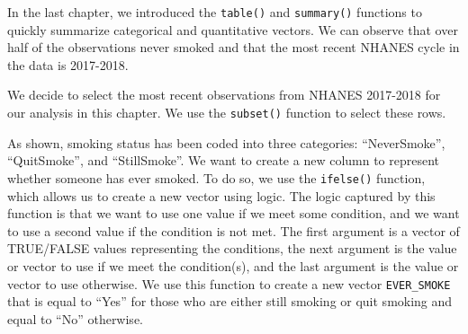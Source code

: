 \documentclass[
  letterpaper,
]{latex/krantz}
\makeatletter
\newenvironment{Shaded}{\begin{snugshade}}{\end{snugshade}}
\newcommand{\CommentTok}[1]{\textcolor[rgb]{0.37,0.37,0.37}{#1}}
\newcommand{\DecValTok}[1]{\textcolor[rgb]{0.68,0.00,0.00}{#1}}
\newcommand{\FunctionTok}[1]{\textcolor[rgb]{0.28,0.35,0.67}{#1}}
\newcommand{\NormalTok}[1]{\textcolor[rgb]{0.00,0.23,0.31}{#1}}
\newcommand{\OtherTok}[1]{\textcolor[rgb]{0.00,0.23,0.31}{#1}}
\newcommand{\SpecialCharTok}[1]{\textcolor[rgb]{0.37,0.37,0.37}{#1}}
\newenvironment{kframe}{%
\medskip{}
\setlength{\fboxsep}{.8em}
 \def\at@end@of@kframe{}%
 \ifinner\ifhmode%
  \def\at@end@of@kframe{\end{minipage}}%
  \begin{minipage}{\columnwidth}%
 \fi\fi%
 \def\FrameCommand##1{\hskip\@totalleftmargin \hskip-\fboxsep
 \colorbox{shadecolor}{##1}\hskip-\fboxsep
     \hskip-\linewidth \hskip-\@totalleftmargin \hskip\columnwidth}%
 \MakeFramed {\advance\hsize-\width
   \@totalleftmargin\z@ \linewidth\hsize
   \@setminipage}}%
 {\par\unskip\endMakeFramed%
 \at@end@of@kframe}
\renewenvironment{Shaded}{\begin{kframe}}{\end{kframe}}
\makeatother
\begin{document}
In the last chapter, we introduced the
\texttt{table()} and
\texttt{summary()}
functions to quickly summarize categorical and quantitative vectors. We
can observe that over half of the observations never smoked and that the
most recent NHANES cycle in the data is 2017-2018.

\begin{Shaded}
\end{Shaded}

We decide to select the most recent observations from NHANES 2017-2018
for our analysis in this chapter. We use the \texttt{subset()}
 function to select these
rows.

\begin{Shaded}
\end{Shaded}

As shown, smoking status has been coded into three categories:
``NeverSmoke'', ``QuitSmoke'', and ``StillSmoke''. We want to create a
new column to represent whether someone has ever smoked. To do so, we
use the \texttt{ifelse()} 
function, which allows us to create a new vector using logic. The logic
captured by this function is that we want to use one value if we meet
some condition, and we want to use a second value if the condition is
not met. The first argument is a vector of TRUE/FALSE values
representing the conditions, the next argument is the value or vector to
use if we meet the condition(s), and the last argument is the value or
vector to use otherwise. We use this function to create a new vector
\texttt{EVER\_SMOKE} that is equal to ``Yes'' for those who are either
still smoking or quit smoking and equal to ``No'' otherwise.
\end{document}
